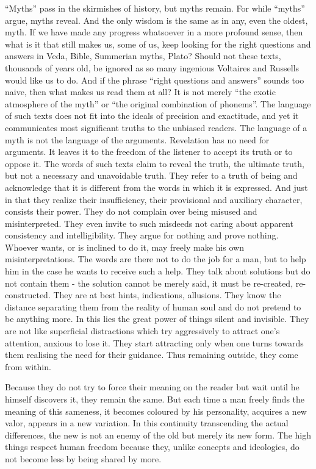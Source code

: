 ``Myths'' pass in the skirmishes of history, but myths remain. For while ``myths''
argue, myths reveal.
And the only wisdom  is the same as in any, even the oldest, myth.
If we have made any progress whatsoever in 
a more profound sense, then what is it that still makes us, some of us, keep
looking for the right questions and answers in Veda, Bible, Summerian myths,
Plato? Should not these texts, thousands of years old, be ignored as so many
ingenious Voltaires and Russells would like us to do. And if the phrase
``right questions and answers'' sounds too naive, then what makes us read them
at all? It is not merely ``the exotic atmosphere of the myth'' or ``the 
original combination of phonems''. 
The language of such texts does not fit into the ideals of precision and 
exactitude, and yet it communicates most significant truths to the unbiased
readers. The language of a myth is not the language of the arguments. 
Revelation has no need for arguments.
It leaves it
to the freedom of the listener to accept its truth or to oppose it. The words
of such texts claim
to reveal the truth, the ultimate truth, but not a necessary and unavoidable
truth. They refer to a truth of being and acknowledge that it is different from
the words in which it is expressed. And just in that they realize their
insufficiency, their provisional and auxiliary character, consists their power.
They do not complain over being misused and misinterpreted. They even invite to
such misdeeds not caring about apparent consistency and intelligibility. They
argue for nothing and prove nothing. Whoever wants, or is inclined to do it, may
freely make his own misinterpretations. The words are there not to do the job
for a man, but to help him in the case he wants to receive such a help. They
talk about solutions but do not contain them - the solution cannot be merely 
said, it must  be re-created, re-constructed. They are at best hints, 
indications, allusions. They know the distance separating them from the reality
of human soul and do not pretend to be anything more. In this lies the great
power of things silent and invisible. They are not like superficial
distractions which try aggressively to attract one's attention, anxious to
lose it. They start attracting only when one  turns towards them 
realising the need for their guidance. Thus remaining outside, they come from
within.

Because they do not try to force their meaning on the reader but wait until he
himself discovers it, they remain the same. But each time a man freely finds
the meaning of this sameness, it becomes coloured by his personality, acquires
a new valor, appears in a new variation. In this continuity transcending the
actual differences, the new is not an enemy of the old but merely its new form.
The high things respect human freedom
because they, unlike concepts and ideologies, do not become less by being 
shared by more. 

